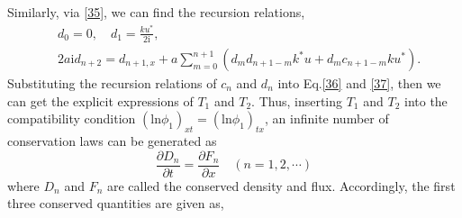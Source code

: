 \documentclass[12pt]{article}
\begin{document}
Similarly, via \eqref{35}, we can find the recursion relations,
\begin{align}
  & d_{0} = 0, \quad d_{1} = \frac{ku^{*}}{2\mathrm{i}}, \\
  & 2a\mathrm{i}d_{n+2} = d_{n+1,x} + a\sum_{m=0}^{n+1}(d_{m}d_{n+1-m}k^{*}u + d_{m}c_{n+1-m}ku^{*}).
\end{align}
Substituting the recursion relations of $c_{n}$ and $d_{n}$ into Eq.\eqref{36} and \eqref{37}, then we can get the explicit expressions of $T_{1}$ and $T_{2}$. Thus, inserting $T_{1}$ and $T_{2}$ into the compatibility condition $(\mathrm{ln}\phi_{1})_{xt} = (\mathrm{ln}\phi_{1})_{tx}$, an infinite number of conservation laws can be generated as
\begin{equation}
  \frac{\partial D_{n}}{\partial t} = \frac{\partial F_{n}}{\partial x}\quad(n = 1, 2, \cdots)
\end{equation}
where $D_{n}$ and $F_{n}$ are called the conserved density and flux. Accordingly, the first three conserved quantities are given as,
\end{document}
